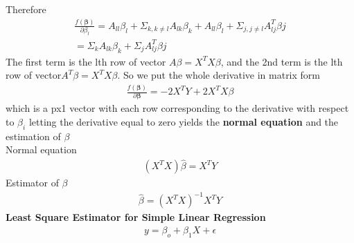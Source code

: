\documentclass[a4paper]{article}
\begin{document}
Therefore
\begin{align*}
\frac{f(\boldsymbol \beta)}{\partial \beta_l}  = A_{ll} \beta_l + \Sigma_{k, k\neq l} A_{lk}\beta_{k} + A_{ll} \beta_l + \Sigma_{j, j \neq l} A^T_{lj}\beta{j} \\
= \Sigma_{k} A_{lk}\beta_{k} + \Sigma_{j} A^T_{lj}\beta{j}
\end{align*}
The first term is the lth row of vector $A\beta = X^TX\beta$, and the 2nd term is the lth row of vector$A^T\beta=X^TX\beta$. So we put the whole derivative in matrix form
\begin{align*}
\frac{f(\boldsymbol \beta)}{\partial {\boldsymbol \beta}} = -2X^TY+2X^TX\beta
\end{align*}
which is a px1 vector with each row corresponding to the derivative with respect to $\beta_i$
letting the derivative equal to zero yields the {\bf normal equation} and the estimation of $\beta$\\
Normal equation
\begin{align*}
(X^TX) \hat \beta = X^TY
\end{align*}
Estimator of $\beta$
\begin{align*}
\hat \beta = (X^TX)^{-1}X^TY
\end{align*}
{\bf Least Square Estimator for Simple Linear Regression}\\
\begin{align*}
y =  \beta_o + \beta_1 X + \epsilon\\
\end{align*}
\end{document}
